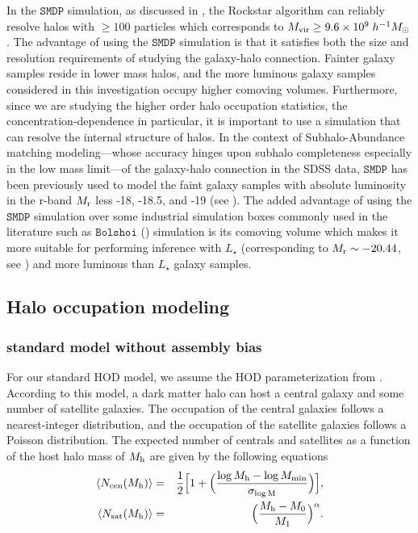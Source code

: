 In the $\mathtt{SMDP}$ simulation, as discussed in \citealt{halodemographic}, the Rockstar algorithm can reliably resolve halos with $\geq 100$ particles which corresponds to $M_{\rm vir} \geq 9.6 \times 10^{9} \; h^{-1}M_{\odot}$. The advantage of using the $\mathtt{SMDP}$ simulation is that it satisfies both the size and resolution requirements of studying the galaxy-halo connection. Fainter galaxy samples reside in lower mass halos, and the more luminous galaxy samples considered in this investigation occupy higher comoving volumes. Furthermore, since we are studying the higher order halo occupation statistics, the concentration-dependence in particular, it is important to use a simulation that can resolve the internal structure of halos. In the context of Subhalo-Abundance matching modeling---whose accuracy hinges upon subhalo completeness especially in the low mass limit---of the galaxy-halo connection in the SDSS data, $\mathtt{SMDP}$ has been previously used to model the faint galaxy samples with absolute luminosity in the r-band $M_{\rm r}$ less -18, -18.5, and -19 (see \citealt{hod_vs_sham}). The added advantage of using the $\mathtt{SMDP}$ simulation over some industrial simulation boxes commonly used in the literature such as $\mathtt{Bolshoi}$ (\citealt{Klypin2011,smallmultidark}) simulation is its comoving volume which makes it more suitable for performing inference with $L_{\star}$ (corresponding to $M_{\rm r} \sim -20.44$, see \citealt{blanton2003}) and more luminous than $L_{\star}$ galaxy samples.

\subsection{Halo occupation modeling}
\subsubsection{standard model without assembly bias}\label{subsubsec:hod}

For our standard HOD model, we assume the HOD parameterization from \citealt{zheng07}. 
According to this model, a dark matter halo can host a central galaxy and some number of satellite galaxies. The occupation of the central galaxies follows a nearest-integer distribution, 
and the occupation of the satellite galaxies follows a Poisson distribution. The expected number of centrals and satellites as a function of the host halo mass of $M_{\rm h}$ are given by the following equations 
\begin{eqnarray}
\langle N_{\rm cen}(M_{\rm h}) \rangle &=& \frac{1}{2}\Big[1+\Big(\frac{\log M_{\rm h} - \log M_{\rm min}}{\sigma_{\log \rm{M}}} \Big) \Big], \label{hod:central}\\ 
\langle N_{\rm sat}(M_{\rm h}) \rangle &=& \Big( \frac{M_{\rm h} - M_{\rm{0}}}{M_{\rm 1}} \Big)^{\alpha}. \label{hod:satellite}
\end{eqnarray}

